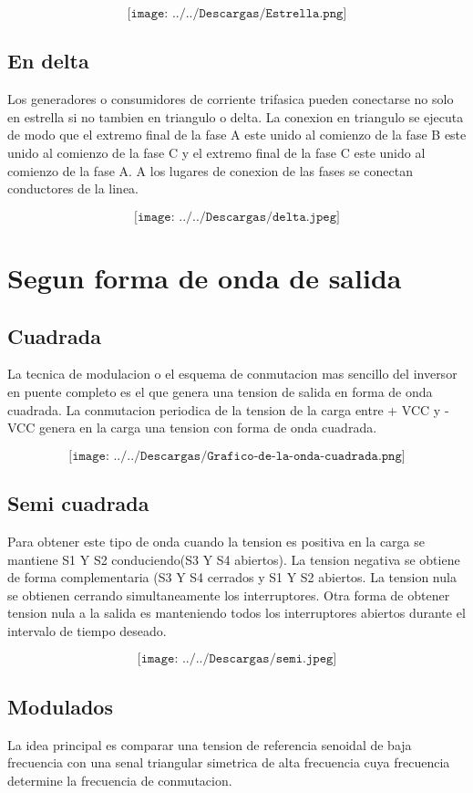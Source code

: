 \documentclass[12pt,a4paper]{report}
\begin{document}
$$\texttt{[image: ../../Descargas/Estrella.png]} $$
\subsection{En delta}
Los generadores o consumidores de corriente trifasica pueden conectarse no solo en estrella si no tambien en triangulo o delta. La conexion en triangulo se ejecuta de modo que el extremo final de la fase A este unido al comienzo de la fase B este unido al comienzo de la fase C y el extremo final de la fase C este unido al comienzo de la fase A. A los lugares de conexion de las fases se conectan conductores de la linea.

$$\texttt{[image: ../../Descargas/delta.jpeg]}$$ 

\section{Segun forma de onda de salida}
\subsection{Cuadrada}
La tecnica de modulacion o el esquema de conmutacion mas sencillo del inversor en puente completo es el que genera una tension de salida en forma de onda cuadrada.
La conmutacion periodica de la tension de la carga entre + VCC y -VCC genera en la carga una tension con forma de onda cuadrada.

$$\texttt{[image: ../../Descargas/Grafico-de-la-onda-cuadrada.png]} $$
\subsection{Semi cuadrada}
Para obtener este tipo de onda cuando la tension es positiva en la carga se mantiene S1 Y S2 conduciendo(S3 Y S4 abiertos). La tension negativa se obtiene de forma complementaria (S3 Y S4 cerrados y S1 Y S2 abiertos.
La tension nula se obtienen cerrando simultaneamente los interruptores. Otra forma de obtener tension nula a la salida es manteniendo todos los interruptores abiertos durante el intervalo de tiempo deseado.

$$\texttt{[image: ../../Descargas/semi.jpeg]} $$
\subsection{Modulados}
La idea principal es comparar una tension de referencia senoidal de baja frecuencia con una senal triangular simetrica de alta frecuencia cuya frecuencia determine la frecuencia de conmutacion.
\end{document}
